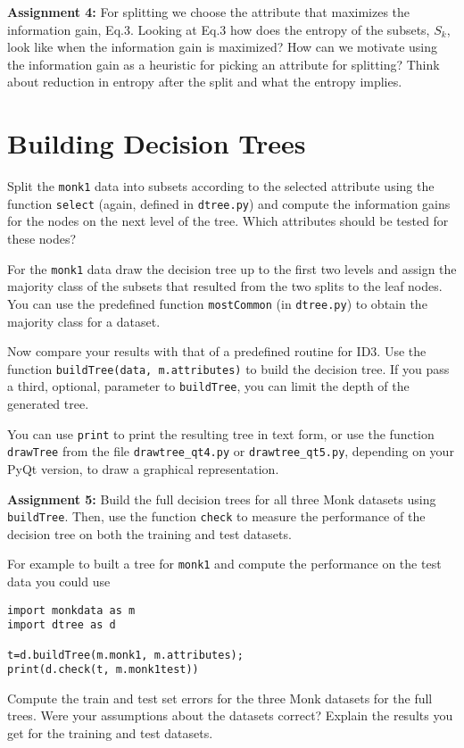 \documentclass[11pt]{article}
\begin{document}
\begin{tcolorbox}
\textbf{Assignment 4:} 
For splitting we choose the attribute that maximizes the information gain, Eq.3. 
Looking at Eq.3 how does the entropy of the subsets, $S_k$, look like when the 
information gain is maximized? How can we motivate using the information gain
as a heuristic for picking an attribute for splitting? Think about reduction
in entropy after the split and what the entropy implies.
\end{tcolorbox}


\section{Building Decision Trees}

Split the \texttt{monk1} data into subsets according to the selected
attribute using the function \texttt{select} (again, defined in
\verb!dtree.py!)  and compute the information gains for the nodes on
the next level of the tree.  Which attributes should be tested for
these nodes?

For the \texttt{monk1} data draw the decision tree up to the first two
levels and assign the majority class of the subsets that resulted from
the two splits to the leaf nodes.  You can use the predefined function
\texttt{mostCommon} (in \verb!dtree.py!) to obtain the majority class
for a dataset.

Now compare your results with that of a predefined routine for ID3.
Use the function \verb!buildTree(data, m.attributes)! to build the
decision tree.  If you pass a third, optional, parameter to
\texttt{buildTree}, you can limit the depth of the generated tree.

You can use \texttt{print} to print the resulting tree in text form,
or use the function \texttt{drawTree} from the file \verb!drawtree_qt4.py! 
or \verb!drawtree_qt5.py!, depending on your PyQt version, to draw a graphical 
representation.

\begin{tcolorbox}
\textbf{Assignment 5:} 
Build the full decision trees for all three Monk datasets using
\texttt{buildTree}.  Then, use the function \texttt{check} to measure the performance
of the decision tree on both the training and test datasets.

For example to built a tree for \texttt{monk1} and compute the performance on the test data
you could use
\begin{verbatim}
import monkdata as m
import dtree as d

t=d.buildTree(m.monk1, m.attributes);
print(d.check(t, m.monk1test))
\end{verbatim}

Compute the train and test set errors for the three Monk datasets for
the full trees. Were your assumptions about the datasets correct? Explain the 
results you get for the training and test datasets.
\end{tcolorbox}
\end{document}
